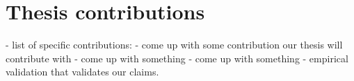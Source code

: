 \section{Thesis contributions}
\label{section:thesiscontributions}
- list of specific contributions:
	- come up with some contribution our thesis will contribute with
	- come up with something
	- come up with something
	- empirical validation that validates our claims. 
	


